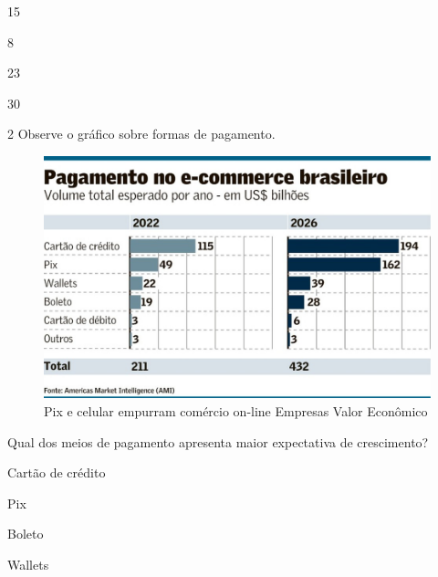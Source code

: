 \begin{escolha}

  \item 15

  \item 8

  \item 23

  \item 30

\end{escolha}

\pagebreak
\num{2} Observe o gráfico sobre formas de pagamento. 

\begin{figure}[htpb!]
\centering
\includegraphics[width=\textwidth]{./_SAEB_9_MAT/media/image225.jpeg}
\caption{Pix e celular empurram comércio on-line \textbar{} Empresas
\textbar{} Valor Econômico}
\end{figure}



Qual dos meios de pagamento apresenta maior expectativa de crescimento?

\begin{escolha}
  \item Cartão de crédito

  \item Pix

  \item Boleto

  \item Wallets
\end{escolha}

